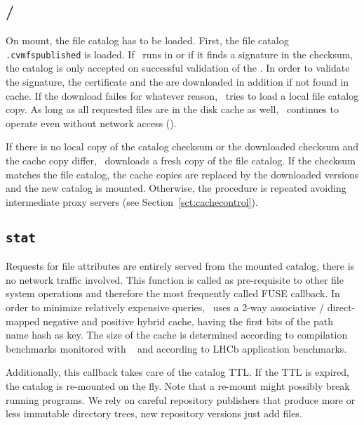 \subsection{{\tt {}} / {\tt {}}}
On mount, the file catalog has to be loaded.
First, the file catalog  \texttt{.cvmfspublished} is loaded.
If \cvmfs\ runs in  or if it finds a signature in the checksum, the catalog is only accepted on successful validation of the .
In order to validate the signature, the certificate and the  are downloaded in addition if not found in cache.
If the download failes for whatever reason, \cvmfs\ tries to load a local file catalog copy.
As long as all requested files are in the disk cache as well, \cvmfs\ continues to operate even without network access ().

If there is no local copy of the catalog checksum or the downloaded checksum and the cache copy differ, \cvmfs\ downloads a fresh copy of the file catalog.
If the checksum matches the file catalog, the cache copies are replaced by the downloaded versions and the new catalog is mounted.
Otherwise, the procedure is repeated avoiding intermediate proxy servers (see Section~\ref{sct:cachecontrol}).

\subsection{\tt stat}
Requests for file attributes are entirely served from the mounted catalog, \ie there is no network traffic involved.
This function is called as pre-requisite to other file system operations and therefore the most frequently called FUSE callback.
In order to minimize relatively expensive  queries, \cvmfs\ uses a 2-way associative / direct-mapped negative and positive hybrid cache, having the first bits of the  path name hash as key.
The size of the cache is determined according to compilation benchmarks monitored with ~\cite{callgrind} and according to LHCb application benchmarks.

Additionally, this callback takes care of the catalog TTL.
If the TTL is expired, the catalog is re-mounted on the fly.
Note that a re-mount might possibly break running programs.
We rely on careful repository publishers that produce more or less immutable directory trees, \ie new repository versions just add files.

